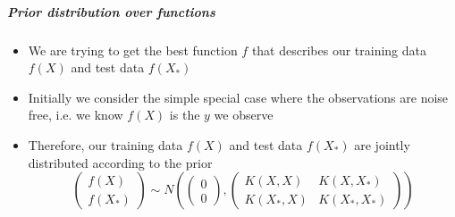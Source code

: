 \documentclass[12pt]{article}
\begin{document}
\subparagraph{Prior distribution over functions}
\begin{itemize}
    \item We are trying to get the best function $f$ that describes our training data $f(X)$ and test data $f(X_*)$
    \item Initially we consider the simple special case where the observations are noise free, i.e. we know $f(X)$ is the $y$ we observe
    \item Therefore, our training data $f(X)$ and test data $f(X_*)$ are jointly distributed according to the prior
\begin{equation}
    \begin{pmatrix}
        f(X) \\ f(X_*)
    \end{pmatrix} \sim N\left(
    \begin{pmatrix}
        0 \\ 0
    \end{pmatrix},
    \begin{pmatrix}
        K(X,X) & K(X,X_*) \\ K(X_*,X) & K(X_*,X_*)
    \end{pmatrix}
    \right)
\end{equation}
\end{itemize}
\end{document}
